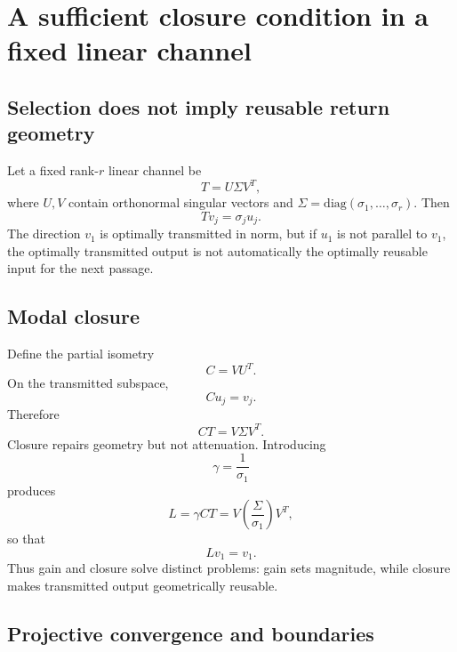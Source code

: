 \documentclass[aps,pre,preprint,superscriptaddress,nofootinbib]{revtex4-2}
\begin{document}
\section{A sufficient closure condition in a fixed linear channel}

\subsection{Selection does not imply reusable return geometry}

Let a fixed rank-$r$ linear channel be
\begin{equation}
 T=U\Sigma V^T,
\end{equation}
where $U,V$ contain orthonormal singular vectors and $\Sigma=\mathrm{diag}(\sigma_1,\ldots,\sigma_r)$. Then
\begin{equation}
 Tv_j=\sigma_ju_j.
\end{equation}
The direction $v_1$ is optimally transmitted in norm, but if $u_1$ is not parallel to $v_1$, the optimally transmitted output is not automatically the optimally reusable input for the next passage.

\subsection{Modal closure}

Define the partial isometry
\begin{equation}
 C=VU^T.
\end{equation}
On the transmitted subspace,
\begin{equation}
 Cu_j=v_j.
\end{equation}
Therefore
\begin{equation}
 CT=V\Sigma V^T.
\end{equation}
Closure repairs geometry but not attenuation. Introducing
\begin{equation}
 \gamma=\frac{1}{\sigma_1}
\end{equation}
produces
\begin{equation}
 L=\gamma CT=V\left(\frac{\Sigma}{\sigma_1}\right)V^T,
\end{equation}
so that
\begin{equation}
 Lv_1=v_1.
\end{equation}
Thus gain and closure solve distinct problems: gain sets magnitude, while closure makes transmitted output geometrically reusable.

\subsection{Projective convergence and boundaries}
\end{document}
